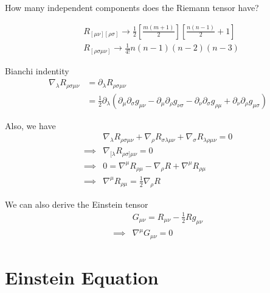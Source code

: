 How many independent components does the Riemann tensor have?

\begin{align}
    &R_{[\mu\nu][\rho\sigma]}\rightarrow \frac{1}{2}\left[\frac{m(m+1)}{2}\right]\left[\frac{n(n-1)}{2}+1\right]\\
    &R_{[\rho\sigma\mu\nu]}\rightarrow\frac{1}{4!}n(n-1)(n-2)(n-3)
\end{align}

Bianchi indentity
\begin{align}
    \nabla_{\lambda}R_{\rho\sigma\mu\nu}&=\partial_{\lambda}R_{\rho\sigma\mu\nu}\\
    &=\frac{1}{2 }\partial_{\lambda}\left(\partial_{\mu}\partial_{\sigma}g_{\mu\nu}-\partial_{\mu}\partial_{\rho}g_{\nu\sigma}-\partial_{\nu}\partial_{\sigma}g_{\rho\mu}+\partial_{\nu}\partial_{\rho }g_{\mu\sigma}\right)
\end{align}

Also, we have
\begin{align}
    &\nabla_{\lambda}R_{\rho\sigma\mu\nu}+\nabla_{\rho}R_{\sigma\lambda\mu\nu}+\nabla_{\sigma}R_{\lambda\rho \mu\nu}=0\\
    \implies& \nabla_{[\lambda}R_{\rho\sigma]\mu\nu}=0\\
    \implies&0=\nabla^{\mu}R_{\rho\mu}-\nabla_{\rho}R+\nabla^{\mu}R_{\rho\mu}\\
    \implies&\nabla^{\mu}R_{\rho\mu}=\frac{1}{2}\nabla_{\rho}R
\end{align}

We can also derive the Einstein tensor
\begin{align}
    &G_{\mu\nu}=R_{\mu\nu}-\frac{1}{2}Rg_{\mu\nu}\\
    \implies&\nabla^{\mu}G_{\mu\nu}=0
\end{align}

\section{Einstein Equation}

